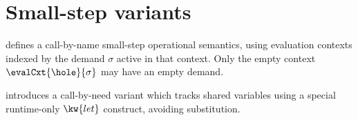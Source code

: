 \section{Small-step variants}

 defines a call-by-name small-step
operational semantics, using evaluation contexts indexed by the demand
$\sigma$ active in that context. Only the empty context
$\evalCxt{\hole}{\sigma}$ may have an empty demand.



 introduces a call-by-need variant which
tracks shared variables using a special runtime-only $\kw{let}$
construct, avoiding substitution.



